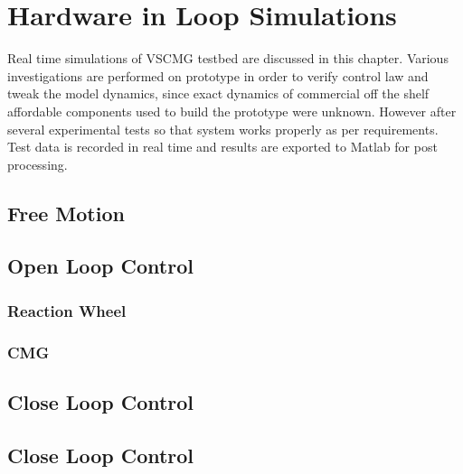 \chapter{Hardware in Loop Simulations}
\label{chap:9}
Real time simulations of VSCMG testbed are discussed in this chapter. 
Various investigations are performed on prototype in order to verify control law and tweak the model dynamics, since exact dynamics of commercial off the shelf affordable components used to build the prototype were unknown. However after several experimental tests so that system works properly as per requirements. Test data is recorded in real time and results are exported to Matlab for post processing.
\section{Free Motion}
\section{Open Loop Control}
\subsection{Reaction Wheel}
\subsection{CMG}

\section{Close Loop Control}
\section{Close Loop Control}